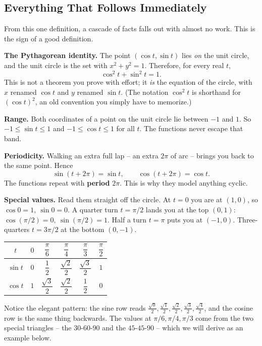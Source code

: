 \subsection{Everything That Follows Immediately}

From this one definition, a cascade of facts falls out with almost no work. This is the sign of a good definition.

\textbf{The Pythagorean identity.} The point $(\cos t, \sin t)$ lies \emph{on} the unit circle, and the unit circle is the set with $x^2 + y^2 = 1$. Therefore, for every real $t$,
\[
  \boxed{\;\cos^2 t + \sin^2 t = 1.\;}
\]
This is not a theorem you prove with effort; it \emph{is} the equation of the circle, with $x$ renamed $\cos t$ and $y$ renamed $\sin t$. (The notation $\cos^2 t$ is shorthand for $(\cos t)^2$, an old convention you simply have to memorize.)

\textbf{Range.} Both coordinates of a point on the unit circle lie between $-1$ and $1$. So $-1 \le \sin t \le 1$ and $-1 \le \cos t \le 1$ for all $t$. The functions never escape that band.

\textbf{Periodicity.} Walking an extra full lap -- an extra $2\pi$ of arc -- brings you back to the same point. Hence
\[
  \sin(t + 2\pi) = \sin t,\qquad \cos(t + 2\pi) = \cos t.
\]
The functions repeat with \textbf{period} $2\pi$. This is why they model anything cyclic.

\textbf{Special values.} Read them straight off the circle. At $t=0$ you are at $(1,0)$, so $\cos 0 = 1,\ \sin 0 = 0$. A quarter turn $t = \pi/2$ lands you at the top $(0,1)$: $\cos(\pi/2) = 0,\ \sin(\pi/2) = 1$. Half a turn $t=\pi$ puts you at $(-1,0)$. Three-quarters $t = 3\pi/2$ at the bottom $(0,-1)$.

\begin{center}
\begin{tabular}{c|ccccc}
\toprule
$t$ & $0$ & $\dfrac{\pi}{6}$ & $\dfrac{\pi}{4}$ & $\dfrac{\pi}{3}$ & $\dfrac{\pi}{2}$ \\[0.6em]
\midrule
$\sin t$ & $0$ & $\dfrac{1}{2}$ & $\dfrac{\sqrt2}{2}$ & $\dfrac{\sqrt3}{2}$ & $1$ \\[0.8em]
$\cos t$ & $1$ & $\dfrac{\sqrt3}{2}$ & $\dfrac{\sqrt2}{2}$ & $\dfrac{1}{2}$ & $0$ \\[0.4em]
\bottomrule
\end{tabular}
\end{center}

Notice the elegant pattern: the sine row reads $\tfrac{\sqrt0}{2}, \tfrac{\sqrt1}{2}, \tfrac{\sqrt2}{2}, \tfrac{\sqrt3}{2}, \tfrac{\sqrt4}{2}$, and the cosine row is the same thing backwards. The values at $\pi/6, \pi/4, \pi/3$ come from the two special triangles -- the $30$-$60$-$90$ and the $45$-$45$-$90$ -- which we will derive as an example below.

